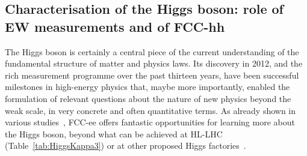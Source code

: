 \subsection{Characterisation of the Higgs boson: role of EW measurements and of FCC-hh}
\label{sec:PhysicsCaseHiggsEW}

The Higgs boson is certainly a central piece of the current understanding of the fundamental structure of matter and physics laws. 
Its discovery in 2012, and the rich measurement programme over the past thirteen years, 
have been successful milestones in high-energy physics that, maybe more importantly, 
enabled the formulation of relevant questions about the nature of new physics beyond the weak scale, 
in very concrete and often quantitative terms. 
As already shown in various studies~\cite{deBlas:2019rxi, DeBlas:2019qco, deBlas:2022ofj}, 
FCC-ee offers fantastic opportunities for learning more about the Higgs boson, 
beyond what can be achieved at HL-LHC (Table~\ref{tab:HiggsKappa3}) or at other proposed Higgs factories~\cite{Blondel:2024mry}.


